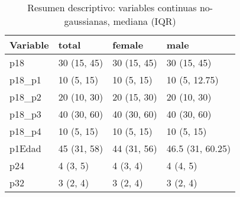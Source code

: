 \begin{table}

\caption{Resumen descriptivo: variables continuas no-gaussianas, mediana (IQR)}
\centering
\begin{tabular}[t]{l|l|l|l}
\hline
Variable & total & female & male\\
\hline
p18 & 30 (15, 45) & 30 (15, 45) & 30 (15, 45)\\
\hline
p18\_p1 & 10 (5, 15) & 10 (5, 15) & 10 (5, 12.75)\\
\hline
p18\_p2 & 20 (10, 30) & 20 (15, 30) & 20 (10, 30)\\
\hline
p18\_p3 & 40 (30, 60) & 40 (30, 60) & 40 (30, 60)\\
\hline
p18\_p4 & 10 (5, 15) & 10 (5, 15) & 10 (5, 15)\\
\hline
p1Edad & 45 (31, 58) & 44 (31, 56) & 46.5 (31, 60.25)\\
\hline
p24 & 4 (3, 5) & 4 (3, 4) & 4 (4, 5)\\
\hline
p32 & 3 (2, 4) & 3 (2, 4) & 3 (2, 4)\\
\hline
\end{tabular}
\end{table}
